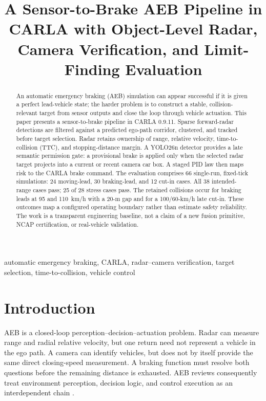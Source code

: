 \documentclass[conference]{IEEEtran}
\title{A Sensor-to-Brake AEB Pipeline in CARLA with Object-Level Radar, Camera Verification, and Limit-Finding Evaluation}
\author{
\IEEEauthorblockN{Mai Viet Hoang and Duc An Pham}
\IEEEauthorblockA{
\textit{Hanoi University of Science and Technology}\\
Hanoi, Vietnam\\
hoangmai04222@gmail.com
}
}
\begin{document}
\maketitle

\begin{abstract}
An automatic emergency braking (AEB) simulation can appear successful if it is
given a perfect lead-vehicle state; the harder problem is to construct a stable,
collision-relevant target from sensor outputs and close the loop through vehicle
actuation. This paper presents a sensor-to-brake pipeline in CARLA 0.9.11. Sparse
forward-radar detections are filtered against a predicted ego-path corridor,
clustered, and tracked before target selection. Radar retains ownership of range,
relative velocity, time-to-collision (TTC), and stopping-distance margin. A
YOLO26n detector provides a late semantic permission gate: a provisional brake
is applied only when the selected radar target projects into a current or recent
camera car box. A staged PID law then maps risk to the CARLA brake command. The
evaluation comprises 66 single-run, fixed-tick simulations: 24 moving-lead, 30
braking-lead, and 12 cut-in cases. All 38 intended-range cases pass; 25 of 28
stress cases pass. The retained collisions occur for braking leads at 95 and
110~km/h with a 20-m gap and for a 100/60-km/h late cut-in. These outcomes map a
configured operating boundary rather than estimate safety reliability. The work
is a transparent engineering baseline, not a claim of a new fusion primitive,
NCAP certification, or real-vehicle validation.
\end{abstract}

\begin{IEEEkeywords}
automatic emergency braking, CARLA, radar--camera verification, target
selection, time-to-collision, vehicle control
\end{IEEEkeywords}

\section{Introduction}
AEB is a closed-loop perception--decision--actuation problem. Radar can measure
range and radial relative velocity, but one return need not represent a vehicle
in the ego path. A camera can identify vehicles, but does not by itself provide
the same direct closing-speed measurement. A braking function must resolve both
questions before the remaining distance is exhausted. AEB reviews consequently
treat environment perception, decision logic, and control execution as an
interdependent chain \cite{yang2022aebreview}.
\end{document}
